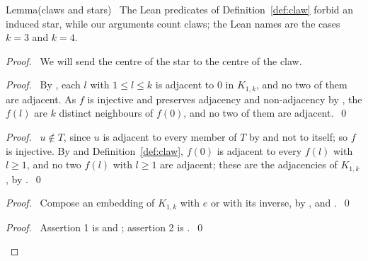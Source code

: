 \begin{namedresult}{Lemma}{(claws and stars)}\label{lem:4-clawstar}
 \new\ The Lean predicates of Definition~\ref{def:claw} forbid an induced star, while our
 arguments count claws; the Lean names are the cases $k=3$ and $k=4$.
\end{namedresult}
\begin{proof}
 \pfsketch\ We will send the centre of the star to the centre of the claw.
 \begin{proof}\pf\ By , each $l$ with $1\le l\le k$ is adjacent
  to 0 in $K_{1,k}$, and no two of them are adjacent. As $f$ is injective and preserves
  adjacency and non-adjacency by , the $f(l)$ are $k$ distinct neighbours of $f(0)$, and
  no two of them are adjacent.~\qed\end{proof}
 \begin{proof}\pf\ $u\notin T$, since $u$ is adjacent to every member of $T$ by  and not to
  itself; so $f$ is injective. By  and Definition~\ref{def:claw}, $f(0)$ is adjacent to
  every $f(l)$ with $l\ge1$, and no two $f(l)$ with $l\ge1$ are adjacent; these are the
  adjacencies of $K_{1,k}$, by .~\qed\end{proof}
 \begin{proof}\pf\ Compose an embedding of $K_{1,k}$ with $e$ or with its inverse, by
  ,  and
  .~\qed\end{proof}
 \qedstep
 \begin{proof}\pf\ Assertion 1 is  and ; assertion 2 is
  .~\qed\end{proof}
\end{proof}

